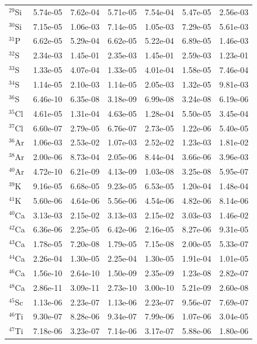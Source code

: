 \begin{table}
\begin{tabular}{l|cc|cc|cc}
$^{29}$Si & 5.74e-05 & 7.62e-04 & 5.71e-05 & 7.54e-04 & 5.47e-05 & 2.56e-03\\
$^{30}$Si & 7.15e-05 & 1.06e-03 & 7.14e-05 & 1.05e-03 & 7.29e-05 & 5.61e-03\\
$^{31}$P & 6.62e-05 & 5.29e-04 & 6.62e-05 & 5.22e-04 & 6.89e-05 & 1.46e-03\\
$^{32}$S & 2.34e-03 & 1.45e-01 & 2.35e-03 & 1.45e-01 & 2.59e-03 & 1.23e-01\\
$^{33}$S & 1.33e-05 & 4.07e-04 & 1.33e-05 & 4.01e-04 & 1.58e-05 & 7.46e-04\\
$^{34}$S & 1.14e-05 & 2.10e-03 & 1.14e-05 & 2.05e-03 & 1.32e-05 & 9.81e-03\\
$^{36}$S & 6.46e-10 & 6.35e-08 & 3.18e-09 & 6.99e-08 & 3.24e-08 & 6.19e-06\\
$^{35}$Cl & 4.61e-05 & 1.31e-04 & 4.63e-05 & 1.28e-04 & 5.50e-05 & 3.45e-04\\
$^{37}$Cl & 6.60e-07 & 2.79e-05 & 6.76e-07 & 2.73e-05 & 1.22e-06 & 5.40e-05\\
$^{36}$Ar & 1.06e-03 & 2.53e-02 & 1.07e-03 & 2.52e-02 & 1.23e-03 & 1.81e-02\\
$^{38}$Ar & 2.00e-06 & 8.73e-04 & 2.05e-06 & 8.44e-04 & 3.66e-06 & 3.96e-03\\
$^{40}$Ar & 4.72e-10 & 6.21e-09 & 4.13e-09 & 1.03e-08 & 3.25e-08 & 5.95e-07\\
$^{39}$K & 9.16e-05 & 6.68e-05 & 9.23e-05 & 6.53e-05 & 1.20e-04 & 1.48e-04\\
$^{41}$K & 5.60e-06 & 4.64e-06 & 5.56e-06 & 4.54e-06 & 4.82e-06 & 8.14e-06\\
$^{40}$Ca & 3.13e-03 & 2.15e-02 & 3.13e-03 & 2.15e-02 & 3.03e-03 & 1.46e-02\\
$^{42}$Ca & 6.36e-06 & 2.25e-05 & 6.42e-06 & 2.16e-05 & 8.27e-06 & 9.31e-05\\
$^{43}$Ca & 1.78e-05 & 7.20e-08 & 1.79e-05 & 7.15e-08 & 2.00e-05 & 5.33e-07\\
$^{44}$Ca & 2.26e-04 & 1.30e-05 & 2.25e-04 & 1.30e-05 & 1.91e-04 & 1.01e-05\\
$^{46}$Ca & 1.56e-10 & 2.64e-10 & 1.50e-09 & 2.35e-09 & 1.23e-08 & 2.82e-07\\
$^{48}$Ca & 2.86e-11 & 3.09e-11 & 2.73e-10 & 3.00e-10 & 5.21e-09 & 2.60e-08\\
$^{45}$Sc & 1.13e-06 & 2.23e-07 & 1.13e-06 & 2.23e-07 & 9.56e-07 & 7.69e-07\\
$^{46}$Ti & 9.30e-07 & 8.28e-06 & 9.34e-07 & 7.99e-06 & 1.07e-06 & 3.04e-05\\
$^{47}$Ti & 7.18e-06 & 3.23e-07 & 7.14e-06 & 3.17e-07 & 5.88e-06 & 1.80e-06\\

\end{tabular}
\end{table}
